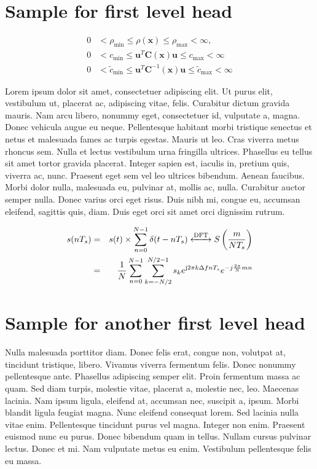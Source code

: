 \documentclass[AMA]{WileyNJD-v1}
\begin{document}


\section{Sample for first level head}\label{sec1}


\begin{align*}
0 &< \rho_{\min} \leq \rho(\bm{x}) \leq \rho_{\max} < \infty, \\
0 &< c_{\min} \leq \bm{u}^T\bm{C}(\bm{x})\bm{u} \leq c_{\max} < \infty\\
0 &< \tilde{c}_{\min} \leq \bm{u}^T\bm{C}^{-1}(\bm{x})\bm{u} \leq \tilde{c}_{\max} < \infty
\end{align*}


Lorem ipsum dolor sit amet, consectetuer adipiscing elit.\cite{Hirt-Amsden-Cook-74} Ut purus elit, vestibulum ut, placerat ac, adipiscing vitae,
felis. Curabitur dictum gravida mauris. Nam arcu libero, nonummy eget, consectetuer id, vulputate a, magna. Donec
vehicula augue eu neque. Pellentesque habitant morbi tristique senectus et netus et malesuada fames ac turpis egestas.
Mauris ut leo. Cras viverra metus rhoncus sem. Nulla et lectus vestibulum urna fringilla ultrices. Phasellus eu tellus
sit amet tortor gravida placerat. Integer sapien est, iaculis in, pretium quis, viverra ac, nunc. Praesent eget sem vel
leo ultrices bibendum. Aenean faucibus. Morbi dolor nulla, malesuada eu, pulvinar at, mollis ac, nulla. Curabitur
auctor semper nulla. Donec varius orci eget risus. Duis nibh mi, congue eu, accumsan eleifend, sagittis quis, diam.
Duis eget orci sit amet orci dignissim rutrum.

\begin{eqnarray}
s(nT_{s}) &= &s(t)\times \sum\limits_{n=0}^{N-1} \delta (t-nT_{s}) \xleftrightarrow{\mathrm{DFT}}  S \left(\frac{m}{NT_{s}}\right) \nonumber\\
&= &\frac{1}{N} \sum\limits_{n=0}^{N-1} \sum\limits_{k=-N/2}^{N/2-1} s_{k} e^{\mathrm{j}2\pi k\Delta fnT_{s}} e^{-j\frac{2\pi}{N}mn}
\end{eqnarray}

\section{Sample for another first level head}\label{sec2}

Nulla malesuada porttitor diam. Donec felis erat, congue non, volutpat at, tincidunt tristique, libero. Vivamus viverra
fermentum felis. Donec nonummy pellentesque ante. Phasellus adipiscing semper elit. Proin fermentum massa ac
quam. Sed diam turpis, molestie vitae, placerat a, molestie nec, leo.\cite{Liska_etal-Synchronized_FCT-JCP-10} Maecenas lacinia. Nam ipsum ligula, eleifend
at, accumsan nec, suscipit a, ipsum. Morbi blandit ligula feugiat magna. Nunc eleifend consequat lorem. Sed lacinia
nulla vitae enim. Pellentesque tincidunt purus vel magna. Integer non enim. Praesent euismod nunc eu purus. Donec
bibendum quam in tellus. Nullam cursus pulvinar lectus. Donec et mi. Nam vulputate metus eu enim. Vestibulum
pellentesque felis eu massa.
\end{document}
